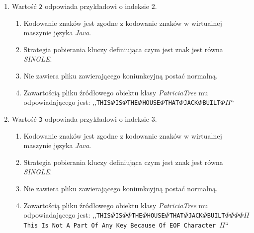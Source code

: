 \begin{enumerate}
\begin{enumerate}[label*=\arabic*.]
    	            \item Wartość \texttt{2} odpowiada przykładowi o indeksie $2$.
    	                \begin{enumerate}
    	                    \item Kodowanie znaków jest zgodne z kodowanie znaków w wirtualnej maszynie języka \emph{Java}.
    	                    \item Strategia pobierania kluczy definiująca czym jest znak jest równa \emph{SINGLE}.
    	                    \item Nie zawiera pliku zawierającego koniunkcyjną postać normalną.
    	                    \item Zawartością pliku źródłowego obiektu klasy \emph{PatriciaTree} mu odpowiadającego jest: \newline
    	                ,,\texttt{THIS$\Phi$IS$\Phi$THE$\Phi$HOUSE$\Phi$THAT$\Phi$JACK$\Phi$BUILT$\Phi\Pi$}``
    	                \end{enumerate}
    	                
    	            \item Wartość \texttt{3} odpowiada przykładowi o indeksie $3$.
    	                \begin{enumerate}
    	                    \item Kodowanie znaków jest zgodne z kodowanie znaków w wirtualnej maszynie języka \emph{Java}.
    	                    \item Strategia pobierania kluczy definiująca czym jest znak jest równa \emph{SINGLE}.
    	                    \item Nie zawiera pliku zawierającego koniunkcyjną postać normalną.
    	                    \item Zawartością pliku źródłowego obiektu klasy \emph{PatriciaTree} mu odpowiadającego jest: \newline
    	                ,,\texttt{THIS$\Phi$IS$\Phi\Phi$THE$\Phi$HOUSE$\Phi$THAT$\Phi$JACK$\Phi$BUILT$\Phi\Phi\Phi\Phi\Pi$ This Is Not A Part Of Any Key Because Of EOF Character $\Pi$}``
    	                \end{enumerate}
    	                

\end{enumerate}
\end{enumerate}
